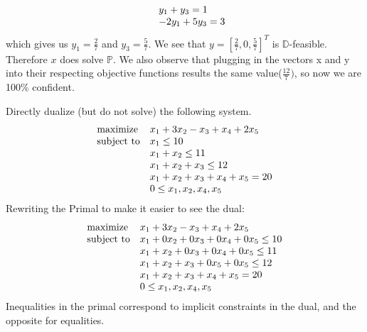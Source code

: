 \documentclass[12pt]{article}
\newenvironment{exercise}[2][Exercise]{\begin{trivlist}
\item[\hskip \labelsep {\bfseries #1}\hskip \labelsep {\bfseries #2.}]}{\end{trivlist}}
\begin{document}
\begin{exercise}{1}
\begin{equation*}
	\begin{array}{ll@{}ll}
		& \displaystyle y_1 + y_3 = 1   \\
		& \displaystyle -2y_1 + 5y_3 = 3 \\
	\end{array}
\end{equation*}
which gives us $y_1=\frac{2}{7}$ and $y_3=\frac{5}{7}$. We see that $y = [\frac{2}{7},0,\frac{5}{7}]^T$ is $\mathbb{D}$-feasible. Therefore $x$ does solve $\mathbb{P}$. We also observe that plugging in the vectors x and y into their respecting objective functions results the same value($\frac{12}{7})$, so now we are 100\% confident.
\end{exercise}

\begin{exercise}{2} Directly dualize (but do not solve) the following system.
\begin{equation*}
\begin{array}{ll@{}ll}
\text{maximize}  & \displaystyle x_1 + 3x_2 - x_3 + x_4 + 2x_5 &\\
\text{subject to}& \displaystyle x_1 \leq 10   \\
                 & \displaystyle x_1 + x_2 \leq 11 \\
                 & \displaystyle x_1 + x_2 + x_3 \leq 12 \\
                 & \displaystyle x_1 + x_2 + x_3 + x_4 + x_5 = 20 \\
                 & \displaystyle 0 \leq x_1,x_2,x_4,x_5
\end{array}
\end{equation*}
Rewriting the Primal to make it easier to see the dual:
\begin{equation*}
	\begin{array}{ll@{}ll}
		\text{maximize}  & \displaystyle x_1 + 3x_2 - x_3 + x_4 + 2x_5 &\\
		\text{subject to}& \displaystyle x_1 + 0x_2+ 0x_3+ 0x_4+ 0x_5 \leq 10   \\
		& \displaystyle x_1 + x_2 + 0x_3+ 0x_4+ 0x_5\leq 11 \\
		& \displaystyle x_1 + x_2 + x_3 + 0x_5+ 0x_5 \leq 12 \\
		& \displaystyle x_1 + x_2 + x_3 + x_4 + x_5 = 20 \\
		& \displaystyle 0 \leq x_1,x_2,x_4,x_5
	\end{array}
\end{equation*}
Inequalities in the primal correspond to implicit constraints in the dual, and the opposite for equalities.

\end{exercise}
\end{document}
